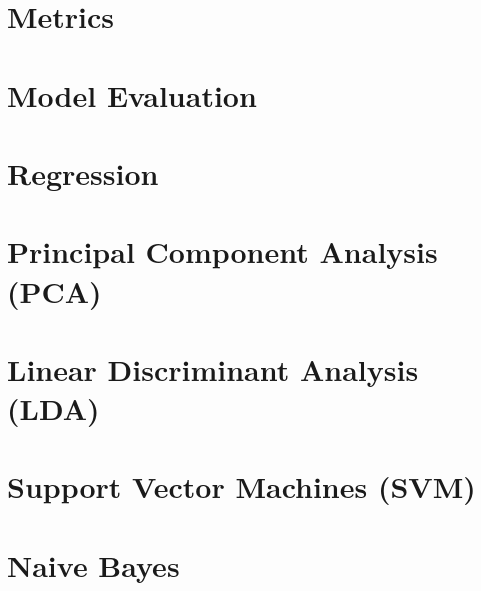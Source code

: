 \documentclass[a4paper]{book}
\begin{document}
\pagestyle{fancy}

\newpage
{}%
\tableofcontents
\newpage

\setcounter{page}{1}













\chapter{Metrics}
\framedtext{\color{red}{TODO:}}
\chapter{Model Evaluation}
\label{ch:model-evaluation}
\framedtext{\color{red}{TODO:}}





\chapter{Regression}
\label{ch:regression}
\framedtext{\color{red}{TODO:}}

\chapter{Principal Component Analysis (PCA)}
\label{ch:pca}
\framedtext{\color{red}{TODO:}}
\chapter{Linear Discriminant Analysis (LDA)}
\label{ch:lda}
\framedtext{\color{red}{TODO:}}
\chapter{Support Vector Machines (SVM)}
\label{ch:svm}
\framedtext{\color{red}{TODO:}}
\chapter{Naive Bayes}
\label{ch:naive-bayes}
\framedtext{\color{red}{TODO:}}
\end{document}
